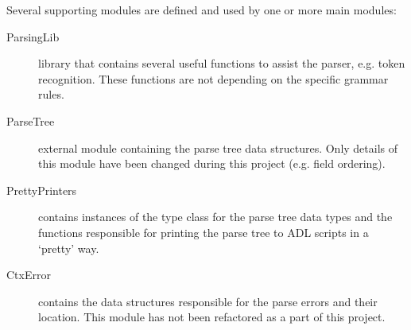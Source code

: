  \noindent
  Several supporting modules are defined and used by one or more main modules:
  \begin{description}
    \item[ParsingLib] library that contains several useful functions to assist the parser, e.g. token recognition.
      These functions are not depending on the specific grammar rules.
      
    \item[ParseTree] external module containing the parse tree data structures.
      Only details of this module have been changed during this project (e.g. field ordering).
    
    \item[PrettyPrinters] contains instances of the  type class for the parse tree data types and the functions responsible for printing the parse tree to ADL scripts in a `pretty' way.

    \item[CtxError] contains the data structures responsible for the parse errors and their location.
      This module has not been refactored as a part of this project.
    
  \end{description}
